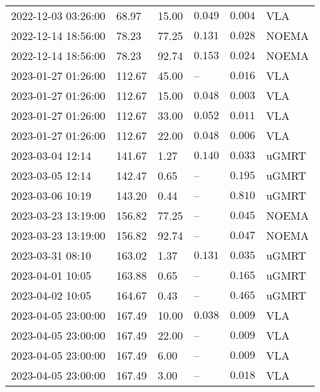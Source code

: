 \documentclass{nature_plusfigure}
\begin{document}
\begin{supplement}
\begin{center}
\begin{longtable}{llllll}
2022-12-03 03:26:00 & 68.97 & 15.00 & $0.049$ & $0.004$ & VLA \\ 
2022-12-14 18:56:00 & 78.23 & 77.25 & $0.131$ & $0.028$ & NOEMA \\ 
2022-12-14 18:56:00 & 78.23 & 92.74 & $0.153$ & $0.024$ & NOEMA \\ 
2023-01-27 01:26:00 & 112.67 & 45.00 & -- & $0.016$ & VLA \\ 
2023-01-27 01:26:00 & 112.67 & 15.00 & $0.048$ & $0.003$ & VLA \\ 
2023-01-27 01:26:00 & 112.67 & 33.00 & $0.052$ & $0.011$ & VLA \\ 
2023-01-27 01:26:00 & 112.67 & 22.00 & $0.048$ & $0.006$ & VLA \\ 
2023-03-04 12:14 & 141.67 & 1.27 & $0.140$ & $0.033$ & uGMRT \\ 
2023-03-05 12:14 & 142.47 & 0.65 & -- & $0.195$ & uGMRT \\ 
2023-03-06 10:19 & 143.20 & 0.44 & -- & $0.810$ & uGMRT \\ 
2023-03-23 13:19:00 & 156.82 & 77.25 & -- & $0.045$ & NOEMA \\ 
2023-03-23 13:19:00 & 156.82 & 92.74 & -- & $0.047$ & NOEMA \\ 
2023-03-31 08:10 & 163.02 & 1.37 & $0.131$ & $0.035$ & uGMRT \\ 
2023-04-01 10:05 & 163.88 & 0.65 & -- & $0.165$ & uGMRT \\ 
2023-04-02 10:05 & 164.67 & 0.43 & -- & $0.465$ & uGMRT \\ 
2023-04-05 23:00:00 & 167.49 & 10.00 & $0.038$ & $0.009$ & VLA \\ 
2023-04-05 23:00:00 & 167.49 & 22.00 & -- & $0.009$ & VLA \\ 
2023-04-05 23:00:00 & 167.49 & 6.00 & -- & $0.009$ & VLA \\ 
2023-04-05 23:00:00 & 167.49 & 3.00 & -- & $0.018$ & VLA \\ 
\hline 
\end{longtable} 
\end{center} 


\end{supplement}

\end{document}
